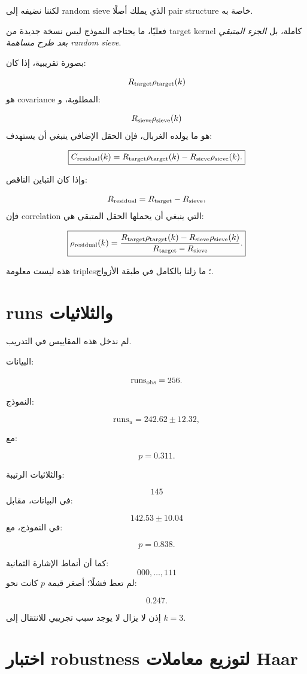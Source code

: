 \documentclass[12pt]{article}
\begin{document}
لكننا نضيفه إلى random sieve الذي يملك أصلًا pair structure خاصة به.

فعليًا، ما يحتاجه النموذج ليس نسخة جديدة من target kernel كاملة، بل
\emph{الجزء المتبقي بعد طرح مساهمة random sieve}.

بصورة تقريبية، إذا كان:

\[
R_{\rm target}\rho_{\rm target}(k)
\]
هو covariance المطلوبة، و:

\[
R_{\rm sieve}\rho_{\rm sieve}(k)
\]
هو ما يولده الغربال، فإن الحقل الإضافي ينبغي أن يستهدف:

\[
\boxed{
C_{\rm residual}(k)
=
R_{\rm target}\rho_{\rm target}(k)
-
R_{\rm sieve}\rho_{\rm sieve}(k).
}
\]

وإذا كان التباين الناقص:

\[
R_{\rm residual}
=
R_{\rm target}-R_{\rm sieve},
\]
فإن correlation التي ينبغي أن يحملها الحقل المتبقي هي:

\[
\boxed{
\rho_{\rm residual}(k)
=
\frac{
R_{\rm target}\rho_{\rm target}(k)
-
R_{\rm sieve}\rho_{\rm sieve}(k)
}{
R_{\rm target}-R_{\rm sieve}
}.
}
\]

هذه ليست معلومة triples؛ ما زلنا بالكامل في طبقة الأزواج.

\section{runs والثلاثيات}

لم ندخل هذه المقاييس في التدريب.

البيانات:

\[
\mathrm{runs}_{\rm obs}=256.
\]

النموذج:

\[
\mathrm{runs}_{u}
=
242.62\pm12.32,
\]

مع:

\[
p=0.311.
\]

والثلاثيات الرتيبة:

\[
145
\]
في البيانات، مقابل:

\[
142.53\pm10.04
\]
في النموذج، مع:

\[
p=0.838.
\]

كما أن أنماط الإشارة الثمانية:
\[
000,\ldots,111
\]
لم تعط فشلًا؛ أصغر قيمة \(p\) كانت نحو:

\[
0.247.
\]

إذن لا يزال لا يوجد سبب تجريبي للانتقال إلى \(k=3\).

\section{اختبار robustness لتوزيع معاملات Haar}
\end{document}
